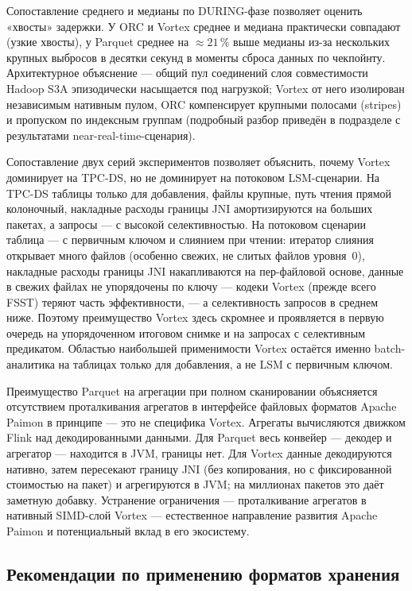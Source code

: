 Сопоставление среднего и медианы по DURING-фазе позволяет оценить «хвосты»
задержки. У ORC и Vortex среднее и медиана практически совпадают (узкие хвосты),
у Parquet среднее на $\approx 21\,\%$ выше медианы из-за нескольких крупных
выбросов в десятки секунд в моменты сброса данных по чекпойнту. Архитектурное
объяснение --- общий пул соединений слоя совместимости Hadoop S3A эпизодически
насыщается под нагрузкой; Vortex от него изолирован независимым нативным пулом,
ORC компенсирует крупными полосами (stripes) и пропуском по индексным группам
(подробный разбор приведён в подразделе с результатами near-real-time-сценария).

Сопоставление двух серий экспериментов позволяет объяснить, почему Vortex
доминирует на TPC-DS, но не доминирует на потоковом LSM-сценарии. На TPC-DS
таблицы только для добавления, файлы крупные, путь чтения прямой колоночный,
накладные расходы границы JNI амортизируются на больших пакетах, а запросы ---
с высокой селективностью. На потоковом сценарии таблица --- с первичным ключом
и слиянием при чтении: итератор слияния открывает много файлов (особенно свежих,
не слитых файлов уровня~0), накладные расходы границы JNI накапливаются на
пер-файловой основе, данные в свежих файлах не упорядочены по ключу --- кодеки
Vortex (прежде всего FSST) теряют часть эффективности, --- а селективность
запросов в среднем ниже. Поэтому преимущество Vortex здесь скромнее и проявляется
в первую очередь на упорядоченном итоговом снимке и на запросах с селективным
предикатом. Областью наибольшей применимости Vortex остаётся именно batch-аналитика
на таблицах только для добавления, а не LSM с первичным ключом.

Преимущество Parquet на агрегации при полном сканировании объясняется отсутствием
проталкивания агрегатов в интерфейсе файловых форматов Apache Paimon в принципе
--- это не специфика Vortex. Агрегаты вычисляются движком Flink над
декодированными данными. Для Parquet весь конвейер --- декодер и агрегатор ---
находится в JVM, границы нет. Для Vortex данные декодируются нативно, затем
пересекают границу JNI (без копирования, но с фиксированной стоимостью на пакет)
и агрегируются в JVM; на миллионах пакетов это даёт заметную добавку. Устранение
ограничения --- проталкивание агрегатов в нативный SIMD-слой Vortex --- естественное
направление развития Apache Paimon и потенциальный вклад в его экосистему.

\subsection{Рекомендации по применению форматов хранения}

